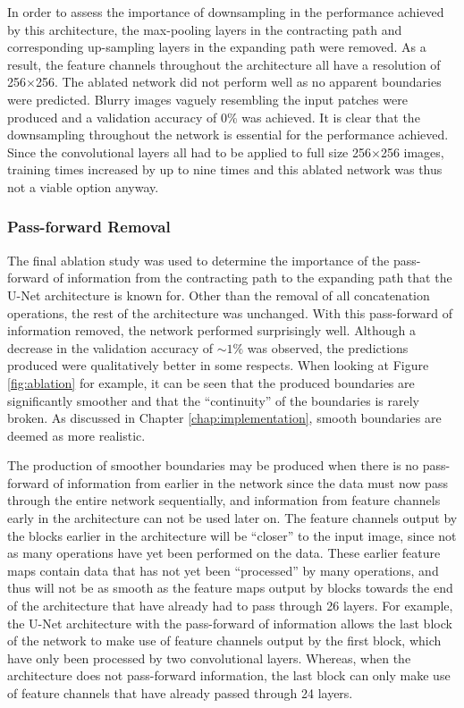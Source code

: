 In order to assess the importance of downsampling in the performance achieved by this architecture, the max-pooling layers in the contracting path and corresponding up-sampling layers in the expanding path were removed. As a result, the feature channels throughout the architecture all have a resolution of 256$\times$256. The ablated network did not perform well as no apparent boundaries were predicted. Blurry images vaguely resembling the input patches were produced and a validation accuracy of 0\% was achieved. It is clear that the downsampling throughout the network is essential for the performance achieved. Since the convolutional layers all had to be applied to full size 256$\times$256 images, training times increased by up to nine times and this ablated network was thus not a viable option anyway.

\subsubsection{Pass-forward Removal}

The final ablation study was used to determine the importance of the pass-forward of information from the contracting path to the expanding path that the U-Net architecture is known for. Other than the removal of all concatenation operations, the rest of the architecture was unchanged. With this pass-forward of information removed, the network performed surprisingly well. Although a decrease in the validation accuracy of ${\sim}1\%$ was observed, the predictions produced were qualitatively better in some respects. When looking at Figure \ref{fig:ablation} for example, it can be seen that the produced boundaries are significantly smoother and that the ``continuity'' of the boundaries is rarely broken. As discussed in Chapter \ref{chap:implementation}, smooth boundaries are deemed as more realistic.

The production of smoother boundaries may be produced when there is no pass-forward of information from earlier in the network since the data must now pass through the entire network sequentially, and information from feature channels early in the architecture can not be used later on. The feature channels output by the blocks earlier in the architecture will be ``closer'' to the input image, since not as many operations have yet been performed on the data. These earlier feature maps contain data that has not yet been ``processed'' by many operations, and thus will not be as smooth as the feature maps output by blocks towards the end of the architecture that have already had to pass through 26 layers. For example, the U-Net architecture with the pass-forward of information allows the last block of the network to make use of feature channels output by the first block, which have only been processed by two convolutional layers. Whereas, when the architecture does not pass-forward information, the last block can only make use of feature channels that have already passed through 24 layers.

